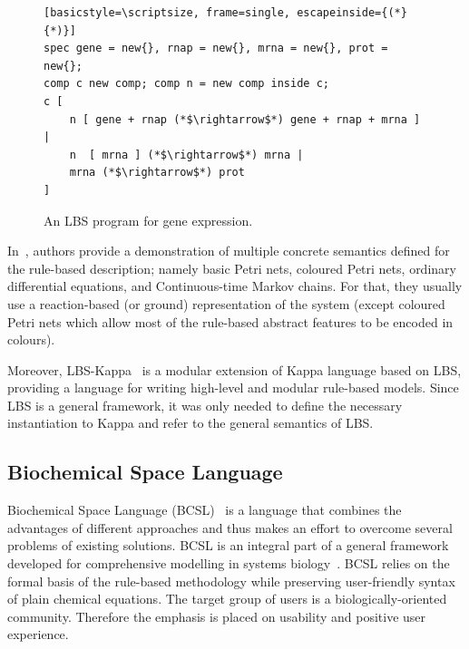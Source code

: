 \documentclass[11pt,a4paper]{report}
\begin{document}
\begin{figure}[!h]
\lstset{language=LBS}
\begin{lstlisting}[basicstyle=\scriptsize, frame=single, escapeinside={(*}{*)}]
spec gene = new{}, rnap = new{}, mrna = new{}, prot = new{}; 
comp c new comp; comp n = new comp inside c;
c [ 
	n [ gene + rnap (*$\rightarrow$*) gene + rnap + mrna ] | 
	n  [ mrna ] (*$\rightarrow$*) mrna | 
	mrna (*$\rightarrow$*) prot
]
\end{lstlisting}
\caption{An LBS program for gene expression.}\label{LBS_example}
\end{figure}

In~\cite{Pedersen}, authors provide a demonstration of multiple concrete semantics defined for the rule-based description; namely basic Petri nets, coloured Petri nets, ordinary differential equations, and Continuous-time Markov chains. For that, they usually use a reaction-based (or ground) representation of the system (except coloured Petri nets which allow most of the rule-based abstract features to be encoded in colours).

Moreover, LBS-Kappa~\cite{pedersen2015high} is a modular extension of Kappa language based on LBS, providing a language for writing high-level and modular rule-based models. Since LBS is a general framework, it was only needed to define the necessary instantiation to Kappa and refer to the general semantics of LBS. 

\subsection{Biochemical Space Language}

Biochemical Space Language (BCSL)~\cite{trojak2018sasb} is a language that combines the advantages of different approaches and thus makes an effort to overcome several problems of existing solutions. BCSL is an integral part of a general framework developed for comprehensive modelling in systems biology~\cite{klement2013comprehensive,BCS}. BCSL relies on the formal basis of the rule-based methodology while preserving user-friendly syntax of plain chemical equations. The target group of users is a biologically-oriented community. Therefore the emphasis is placed on usability and positive user experience.
\end{document}
